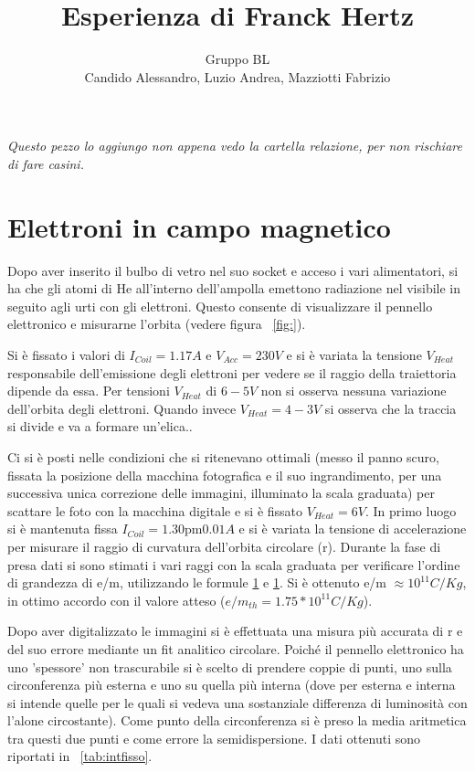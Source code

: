 \documentclass[10pt,a4paper]{article}
\title{Esperienza di Franck Hertz}
\author{Gruppo BL \\ Candido Alessandro, Luzio Andrea, Mazziotti Fabrizio}
\begin{document}
\emph{Questo pezzo lo aggiungo non appena vedo la cartella relazione, per non rischiare di fare casini.}
\section{Elettroni in campo magnetico}
Dopo aver inserito il bulbo di vetro nel suo socket e acceso i vari alimentatori, si ha che gli atomi di He all'interno dell'ampolla emettono radiazione nel visibile in seguito agli urti con gli elettroni. Questo consente di visualizzare il pennello elettronico e misurarne l'orbita (vedere figura \figurename{~\ref{fig:}}).

Si è fissato i valori di $I_{Coil} = \unit{1.17}{A}$ e $V_{Acc} = \unit{230}{V}$ e si è variata la tensione $V_{Heat}$ responsabile dell'emissione degli elettroni per vedere se il raggio della traiettoria dipende da essa.
Per tensioni $V_{Heat}$ di $\unit{6-5}{V}$ non si osserva nessuna variazione dell'orbita degli elettroni. Quando invece $V_{Heat} = \unit{4-3}{V}$ si osserva che la traccia si divide e va a formare un'elica..


Ci si è posti nelle condizioni che si ritenevano ottimali (messo il panno scuro, fissata la posizione della macchina fotografica e il suo ingrandimento, per una successiva unica correzione delle immagini, illuminato la scala graduata) per scattare le foto con la macchina digitale e si è fissato $V_{Heat} = \unit{6}{V}$. In primo luogo si è mantenuta fissa $I_{Coil} = \unit{1.30 \pm 0.01}{A}$
 e si è variata la tensione di accelerazione per misurare il raggio di curvatura dell'orbita circolare (r). Durante la fase di presa dati si sono stimati i vari raggi con la scala graduata per verificare l'ordine di grandezza di e/m, utilizzando le formule \ref{} e \ref{}. Si è ottenuto e/m $\approx \unit{10^{11}}{C/Kg}$, in ottimo accordo con il valore atteso ($e/m_{th} = \unit{1.75*10^{11}}{C/Kg}$).

Dopo aver digitalizzato le immagini si è effettuata una misura più accurata di r e del suo errore mediante un fit analitico circolare. Poiché il pennello elettronico ha uno 'spessore' non trascurabile si è scelto di prendere coppie di punti, uno sulla circonferenza più esterna e uno su quella più interna (dove per esterna e interna si intende quelle per le quali si vedeva una sostanziale differenza di luminosità con l'alone circostante). Come punto della circonferenza si è preso la media aritmetica tra questi due punti e come errore la semidispersione. I dati ottenuti sono riportati in \tablename{~\ref{tab:intfisso}}.
\end{document}
